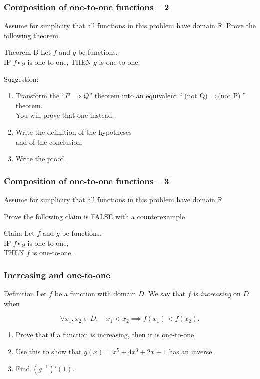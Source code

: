 \documentclass[14pt]{beamer}
\newcommand {\DS} [1] {${\displaystyle #1}$}
\newcommand {\R}{\mathbb{R}}
\newcommand{\p}{\pause}
\begin{document}
\begin{frame}[t]
\frametitle{Composition of one-to-one functions -- 2}

Assume for simplicity that all functions in this problem have domain $\R$.   Prove the following theorem.


\begin{block}{Theorem B}
Let $f$ and $g$ be functions. \\
IF $f \circ g$ is one-to-one, \quad
THEN $g$ is one-to-one.
\end{block}


\p
Suggestion:
	\begin{enumerate}
		\item  Transform the ``\DS{P \implies Q}'' theorem into an equivalent 
		``\DS{\mbox{(not Q)} \implies \mbox{(not P)} }'' theorem.  \\ You will prove that one instead.
\p
		\item Write the definition of the hypotheses \\ and of the conclusion.

		\item Write the proof.
	\end{enumerate}

\end{frame}
\begin{frame}[t]
\frametitle{Composition of one-to-one functions -- 3}

Assume for simplicity that all functions in this problem have domain $\R$.

\vfill

Prove the following claim is FALSE with a counterexample.

\vfill


\begin{block}{Claim }
Let $f$ and $g$ be functions. \\
IF $f \circ g$ is one-to-one, \\
THEN $f$ is one-to-one.
\end{block}

\vfill

\end{frame}

\begin{frame}[t]
\frametitle{Increasing and one-to-one}

\begin{block}{Definition}
Let $f$ be a function with domain $D$. We say that $f$ is \emph{increasing} on $D$ when

$$\forall x_1, x_2 \in D,  \quad x_1<x_2 \implies f(x_1)<f(x_2).
$$
\end{block}

\begin{enumerate}
\item Prove that if a function is increasing, then it is one-to-one.
\p
\item Use this to show that $g(x) = x^5 + 4x^3 + 2x + 1$ has an inverse.
\item Find $(g ^{-1})'(1)$.
\end{enumerate}


\end{frame}
\end{document}
